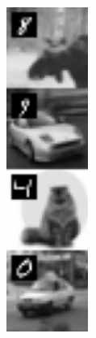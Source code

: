 \documentclass{article} %
\begin{document}
\begin{figure}[t]
    \centering
    \begin{subfigure}{0.0771\textwidth}
        \includegraphics[width=\textwidth]{assets/cifar10-ref.pdf}

\end{subfigure}
\end{figure}
\end{document}

